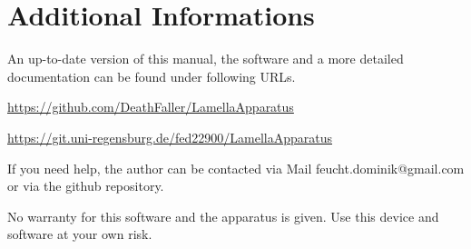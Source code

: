 \chapter{Additional Informations}

An up-to-date version of this manual, the software and a more detailed documentation can be found under following URLs.

\url{https://github.com/DeathFaller/LamellaApparatus}

\url{https://git.uni-regensburg.de/fed22900/LamellaApparatus}

If you need help, the author can be contacted via Mail feucht.dominik@gmail.com or via the github repository. 

No warranty for this software and the apparatus is given. 
Use this device and software at your own risk. 
